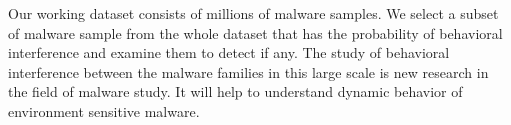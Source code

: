 Our working dataset consists of millions of malware samples.
We select a subset of malware sample from the whole dataset that has the probability of behavioral interference and examine them to detect if any.
The study of behavioral interference between the malware families in this large scale is new research in the field of malware study.
It will help to understand dynamic behavior of environment sensitive malware.
